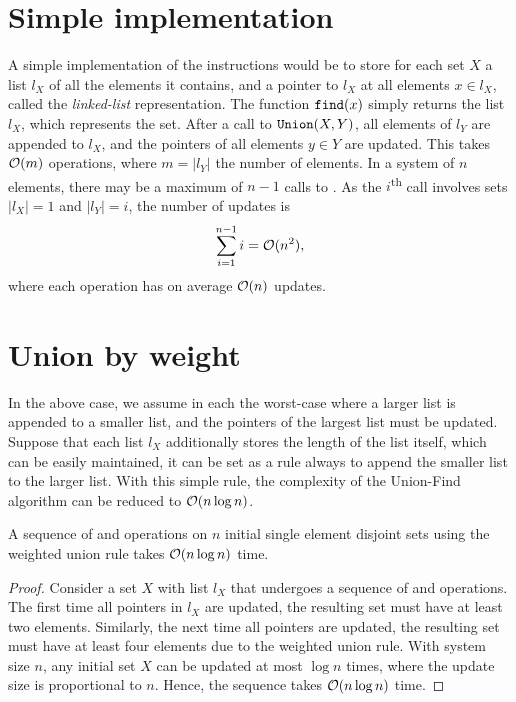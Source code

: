 \section{Simple implementation}
A simple implementation of the instructions would be to store for each set $X$ a list $l_X$ of all the elements it contains, and a pointer to $l_X$ at all elements $x\in l_X$, called the \emph{linked-list} representation. The function $\texttt{find}(x)$ simply returns the list $l_X$, which represents the set. After a call to $\texttt{Union}(X, Y)$, all elements of $l_Y$ are appended to $l_X$, and the pointers of all elements $y\in Y$ are updated. This takes $\mathcal{O}(m)$ operations, where $m=|l_Y|$ the number of elements. In a system of $n$ elements, there may be a maximum of $n-1$ calls to . As the $i$\textsuperscript{th} call involves sets $|l_X|=1$ and $|l_Y|=i$, the number of updates is 
\begin{equation}
  \sum_{i=1}^{n-1} i = \mathcal{O}(n^2),
\end{equation}
where each  operation has on average $\mathcal{O}(n)$ updates. 

\section{Union by weight}
In the above case, we assume in each  the worst-case where a larger list is appended to a smaller list, and the pointers of the largest list must be updated. Suppose that each list $l_X$ additionally stores the length of the list itself, which can be easily maintained, it can be set as a rule always to append the smaller list to the larger list. With this simple rule, the complexity of the Union-Find algorithm can be reduced to $\mathcal{O}(n \log n)$. 

\begin{theorem}
  A sequence of  and  operations on $n$ initial single element disjoint sets using the weighted union rule takes $\mathcal{O}(n \log n)$ time. 
\end{theorem}
\begin{proof}
  Consider a set $X$ with list $l_X$ that undergoes a sequence of  and  operations. The first time all pointers in $l_X$ are updated, the resulting set must have at least two elements. Similarly, the next time all pointers are updated, the resulting set must have at least four elements due to the weighted union rule. With system size $n$, any initial set $X$ can be updated at most $\log n$ times, where the update size is proportional to $n$. Hence, the sequence takes $\mathcal{O}(n \log n)$ time. 
\end{proof}

